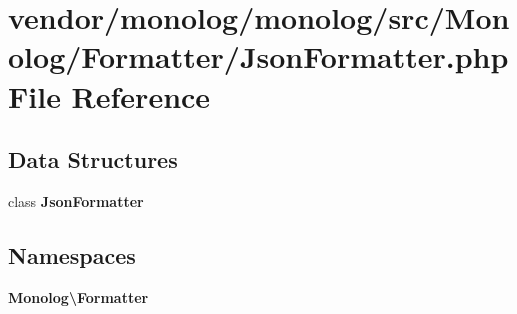 \section{vendor/monolog/monolog/src/\+Monolog/\+Formatter/\+Json\+Formatter.php File Reference}
\label{_json_formatter_8php}
\subsection*{Data Structures}
\begin{DoxyCompactItemize}
\item 
class {\bf Json\+Formatter}
\end{DoxyCompactItemize}
\subsection*{Namespaces}
\begin{DoxyCompactItemize}
\item 
 {\bf Monolog\textbackslash{}\+Formatter}
\end{DoxyCompactItemize}
